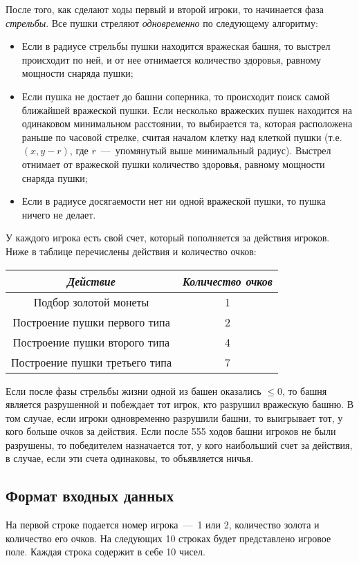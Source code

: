 \documentclass[14pt]{extarticle}
\begin{document}
После того, как сделают ходы первый и второй игроки, то начинается фаза \emph{стрельбы}. Все пушки стреляют \emph{одновременно} по следующему алгоритму:
\begin{itemize}
    \item Если в радиусе стрельбы пушки находится вражеская башня, то выстрел происходит по ней, и от нее отнимается количество здоровья, равному мощности снаряда пушки;
    \item Если пушка не достает до башни соперника, то происходит поиск самой ближайшей вражеской пушки. Если несколько вражеских пушек находится на одинаковом минимальном расстоянии, то выбирается та, которая расположена раньше по часовой стрелке, считая началом клетку над клеткой пушки (т.е. $(x, y - r)$, где $r$~---~упомянутый выше минимальный радиус). Выстрел отнимает от вражеской пушки количество здоровья, равному мощности снаряда пушки;
    \item Если в радиусе досягаемости нет ни одной вражеской пушки, то пушка ничего не делает.
\end{itemize}

У каждого игрока есть свой счет, который пополняется за действия игроков. Ниже в таблице перечислены действия и количество очков:
\begin{table}[h]
    \centering
    \begin{tabular}{|c|c|}
        \hline
        \emph{Действие} & \emph{Количество очков} \\
        \hline
        Подбор золотой монеты & 1 \\
        \hline
        Построение пушки первого типа & 2 \\
        \hline
        Построение пушки второго типа & 4 \\
        \hline
        Построение пушки третьего типа & 7 \\
        \hline
    \end{tabular}
\end{table}

Если после фазы стрельбы жизни одной из башен оказались $\leq 0$, то башня является разрушенной и побеждает тот игрок, кто разрушил вражескую башню. В том случае, если игроки одновременно разрушили башни, то выигрывает тот, у кого больше очков за действия. Если после 555 ходов башни игроков не были разрушены, то победителем назначается тот, у кого наибольший счет за действия, в случае, если эти счета одинаковы, то объявляется ничья.

\subsection*{Формат входных данных}
На первой строке подается номер игрока~---~1 или 2, количество золота и количество его очков.
На следующих 10 строках будет представлено игровое поле. Каждая строка содержит в себе 10 чисел.
\end{document}
